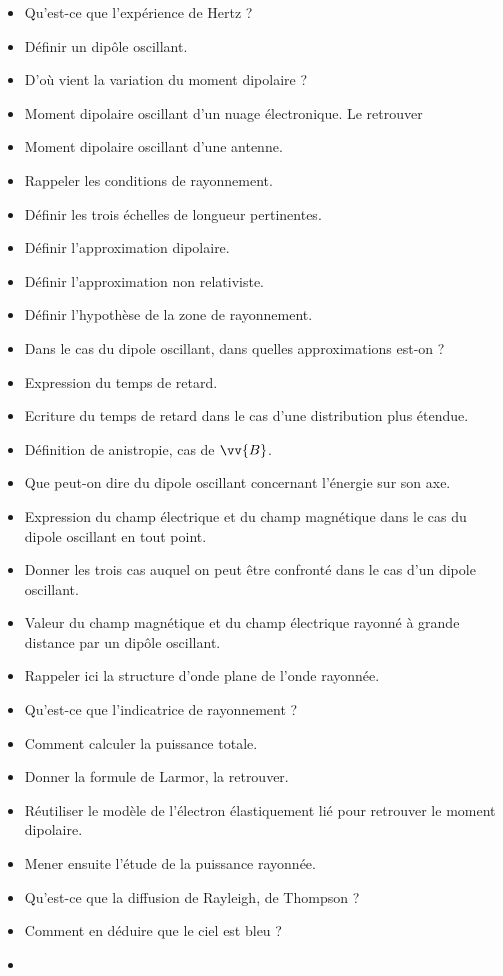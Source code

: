 \documentclass[a4paper, 11pt, hidelinks]{article}
\begin{document}
\begin{itemize}
    \item Qu'est-ce que l'expérience de Hertz ? \cite{Chapitre18}
    \item Définir un dipôle oscillant. \cite{Chapitre18}
    \item D'où vient la variation du moment dipolaire ? \cite{Chapitre18}
    \item Moment dipolaire oscillant d'un nuage électronique. Le retrouver \cite{Chapitre18}
    \item Moment dipolaire oscillant d'une antenne. \cite{Chapitre18}
    \item Rappeler les conditions de rayonnement. \cite{Chapitre18}
    \item Définir les trois échelles de longueur pertinentes. \cite{Chapitre18}
    \item Définir l'approximation dipolaire. \cite{Chapitre18}
    \item Définir l'approximation non relativiste. \cite{Chapitre18}
    \item Définir l'hypothèse de la zone de rayonnement. \cite{Chapitre18}
    \item Dans le cas du dipole oscillant, dans quelles approximations est-on ? \cite{Chapitre18}
    \item Expression du temps de retard. \cite{Chapitre18}
    \item Ecriture du temps de retard dans le cas d'une distribution plus étendue. \cite{Chapitre18}
    \item Définition de anistropie, cas de $\vv{B}$. \cite{Chapitre18}
    \item Que peut-on dire du dipole oscillant concernant l'énergie sur son axe. \cite{Chapitre18}
    \item Expression du champ électrique et du champ magnétique dans le cas du dipole oscillant en tout point. \cite{Chapitre18}
    \item Donner les trois cas auquel on peut être confronté dans le cas d'un dipole oscillant. \cite{Chapitre18}
    \item Valeur du champ magnétique et du champ électrique rayonné à grande distance par un dipôle oscillant. \cite{Chapitre18}
    \item Rappeler ici la structure d'onde plane de l'onde rayonnée. \cite{Chapitre18}
    \item Qu'est-ce que l'indicatrice de rayonnement ? \cite{Chapitre18}
    \item Comment calculer la puissance totale. \cite{Chapitre18}
    \item Donner la formule de Larmor, la retrouver. \cite{Chapitre18}
    \item Réutiliser le modèle de l'électron élastiquement lié pour retrouver le moment dipolaire. \cite{Chapitre18}
    \item Mener ensuite l'étude de la puissance rayonnée. \cite{Chapitre18}
    \item Qu'est-ce que la diffusion de Rayleigh, de Thompson ? \cite{Chapitre18}
    \item Comment en déduire que le ciel est bleu ? \cite{Chapitre18}
    \item 
\end{itemize}
\end{document}
